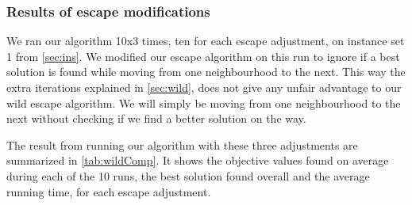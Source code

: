 \documentclass[../main.tex]{subfiles}
\begin{document}
\subsubsection{Results of escape modifications}
We ran our algorithm 10x3 times, ten for each escape adjustment, on instance set 1 from \cref{sec:ins}.
We modified our escape algorithm on this run to ignore if a best solution is found while moving from one neighbourhood to the next. 
This way the extra iterations explained in \cref{sec:wild}, does not give any unfair advantage to our wild escape algorithm. We will simply be moving from one neighbourhood to the next without checking if we find a better solution on the way.
\par
The result from running our algorithm with these three adjustments are summarized in \cref{tab:wildComp}.
It shows the objective values found on average during each of the 10 runs, the best solution found overall and the average running time, for each escape adjustment.
\end{document}
